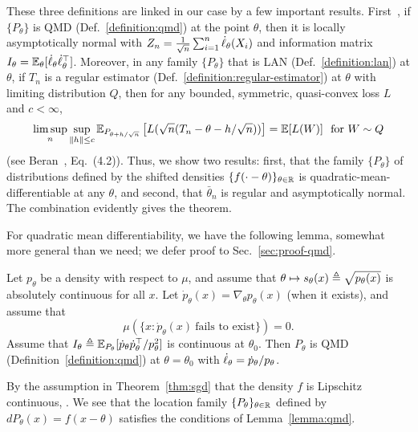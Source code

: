 These three definitions are linked in our case by a few important results.
First~\cite[Theorem 7.2]{VanDerVaart98}, if $\{P_\theta\}$ is QMD
(Def.~\ref{definition:qmd}) at the point $\theta$, then it is locally
asymptotically normal with $Z_n = \frac{1}{\sqrt{n}} \sum_{i = 1}^n
\dot{\ell}_\theta(X_i)$ and information matrix $I_\theta =
\mathbb{E}_\theta[\dot{\ell}_\theta \dot{\ell}_\theta^\top]$. Moreover, in any family
$\{P_\theta\}$ that is LAN (Def.~\ref{definition:lan}) at $\theta$, if $T_n$
is a regular estimator (Def.~\ref{definition:regular-estimator}) at $\theta$
with limiting distribution $Q$, then for any bounded, symmetric,
quasi-convex loss $L$ and $c < \infty$,
\begin{equation}
  \label{eqn:limit-law-regular}
  \limsup_n \sup_{\left\|{h}\right\| \le c}
  \mathbb{E}_{P_{\theta + h/\sqrt{n}}}
  \left[L(\sqrt{n}(T_n - \theta - h / \sqrt{n}))\right]
  = \mathbb{E}[L(W)] ~~ \mbox{for~}W \sim Q
\end{equation}
(see Beran~\cite{beran1995role}, Eq.~(4.2)).
%
Thus, we show two results: first,
that the family $\{P_\theta\}$ of distributions
defined by the shifted densities $\{f(\cdot - \theta)\}_{\theta \in \mathbb{R}}$
is quadratic-mean-differentiable at any $\theta$,
and second, that $\bar{\theta}_n$ is regular and
asymptotically normal.
The combination evidently gives the theorem.

For quadratic mean differentiability, we have the following lemma, somewhat
more general than we need; we defer proof to Sec.~\ref{sec:proof-qmd}.
\begin{lemma}
  \label{lemma:qmd}
  Let $p_\theta$ be a density with respect to $\mu$,
  and assume that $\theta \mapsto s_\theta(x) \triangleq \sqrt{p_\theta(x)}$
  is absolutely continuous for all $x$. Let
  $\dot{p}_\theta(x) = \nabla_\theta p_\theta(x)$ (when it exists),
  and assume that
  \begin{equation*}
    \mu(\{x : \dot{p}_\theta(x) ~ \mbox{fails~to~exist}\}) = 0.
  \end{equation*}
  Assume that $I_\theta \triangleq \mathbb{E}_{P_\theta}[\dot{p}_\theta
    \dot{p}_\theta^\top / p_\theta^2]$ is continuous at $\theta_0$. Then
  $P_\theta$ is QMD (Definition~\ref{definition:qmd}) at $\theta = \theta_0$
  with $\dot{\ell}_\theta = \dot{p}_\theta / p_\theta$.
\end{lemma}

By the assumption in Theorem~\ref{thm:sgd} that the density $f$
is Lipschitz continuous, . We see that the location family
$\{P_\theta\}_{\theta \in \mathbb{R}}$ defined by $dP_\theta(x) = f(x - \theta)$
satisfies the conditions of Lemma~\ref{lemma:qmd}.

